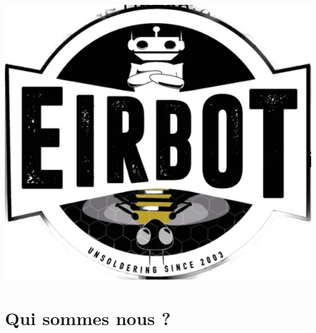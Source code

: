 \documentclass[a4paper,10pt]{article}
\begin{document}
\begin{spacing}{1.5}
{  \includegraphics[scale=0.075]{65508.png} }
\section{Qui sommes nous ?}
\newpage

\end{spacing}
\end{document}
